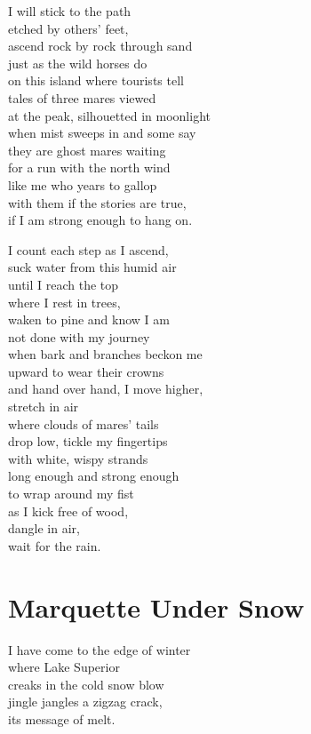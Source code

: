 \documentclass[twoside,10pt]{book}
\begin{document}
I will stick to the path\\
etched by others' feet,\\
ascend rock by rock through sand\\
just as the wild horses do\\
on this island where tourists tell\\
tales of three mares viewed\\
at the peak, silhouetted in moonlight\\
when mist sweeps in and some say\\
they are ghost mares waiting\\
for a run with the north wind\\
like me who years to gallop\\
with them if the stories are true,\\
if I am strong enough to hang on.

I count each step as I ascend,\\
suck water from this humid air\\
until I reach the top\\
where I rest in trees,\\
waken to pine and know I am\\
not done with my journey\\
when bark and branches beckon me\\
upward to wear their crowns\\
and hand over hand, I move higher,\\
stretch in air\\
where clouds of mares' tails\\
drop low, tickle my fingertips\\
with white, wispy strands\\
long enough and strong enough\\
to wrap around my fist\\
as I kick free of wood,\\
dangle in air,\\
wait for the rain.


\clearpage
\section{Marquette Under Snow}

I have come to the edge of winter\\
where Lake Superior\\
creaks in the cold snow blow\\
jingle jangles a zigzag crack,\\
its message of melt.
\end{document}
